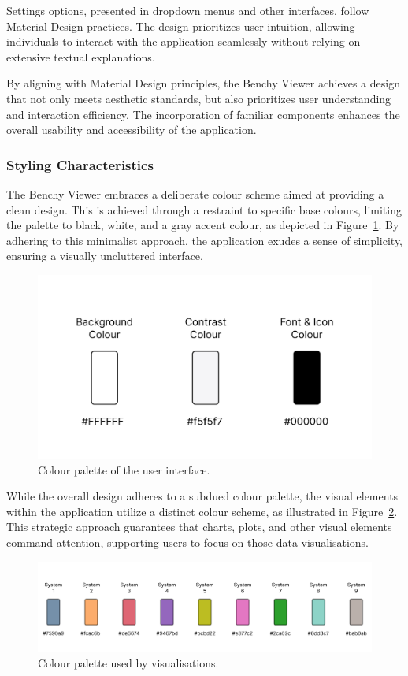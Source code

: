 Settings options, presented in dropdown menus and other interfaces, follow Material Design practices. The design prioritizes user intuition, allowing individuals to interact with the application seamlessly without relying on extensive textual explanations.

By aligning with Material Design principles, the Benchy Viewer achieves a design that not only meets aesthetic standards, but also prioritizes user understanding and interaction efficiency. The incorporation of familiar components enhances the overall usability and accessibility of the application.


\subsubsection{Styling Characteristics}

The Benchy Viewer embraces a deliberate colour scheme aimed at providing a clean design. This is achieved through a restraint to specific base colours, limiting the palette to black, white, and a gray accent colour, as depicted in Figure~\ref{fig:colors}. By adhering to this minimalist approach, the application exudes a sense of simplicity, ensuring a visually uncluttered interface.



\begin{figure}[h]
  \centering
  \includegraphics[width=0.4\linewidth]{figures/colors.png}
  \caption{Colour palette of the user interface.}
  \label{fig:colors}
\end{figure}

While the overall design adheres to a subdued colour palette, the visual elements within the application utilize a distinct colour scheme, as illustrated in Figure~\ref{fig:colors-dbms}. This strategic approach guarantees that charts, plots, and other visual elements command attention, supporting users to focus on those data visualisations.

\begin{figure}[h]
  \centering
  \includegraphics[width=1\linewidth]{figures/colors-dbms.png}
  \caption{Colour palette used by visualisations.}
  \label{fig:colors-dbms}
\end{figure}

